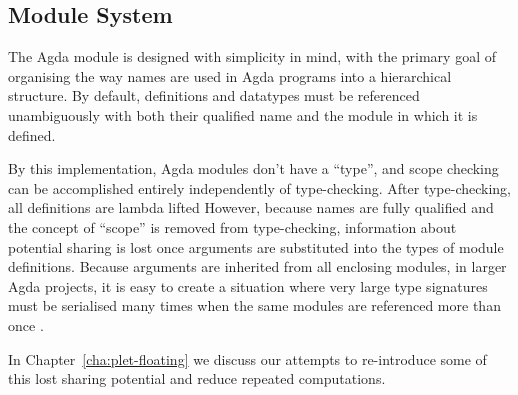 
\subsection{Module System}

The Agda module is designed with simplicity in mind, with the primary goal of organising the way names are used in Agda programs into a hierarchical structure. By default, definitions and datatypes must be referenced unambiguously with both their qualified name and the module in which it is defined.

By this implementation, Agda modules don't have a ``type'', and scope checking can be accomplished entirely independently of type-checking. After type-checking, all definitions are lambda lifted \citep{agdadocs} However, because names are fully qualified and the concept of ``scope'' is removed from type-checking, information about potential sharing is lost once arguments are substituted into the types of module definitions. Because arguments are inherited from all enclosing modules, in larger Agda projects, it is easy to create a situation where very large type signatures must be serialised many times when the same modules are referenced more than once \citep{agdamail}. %

In Chapter~\ref{cha:plet-floating} we discuss our attempts to re-introduce some of this lost sharing potential and reduce repeated computations.
